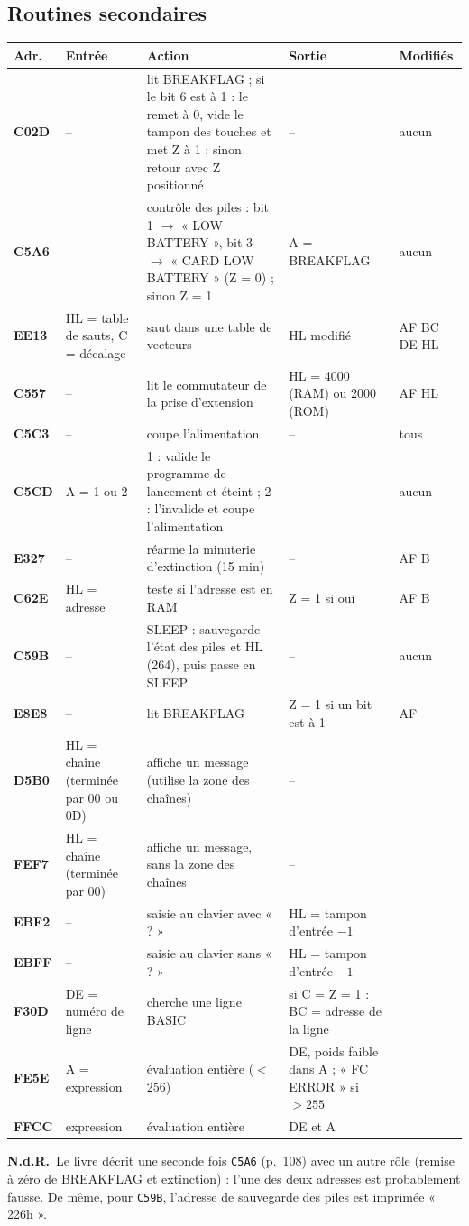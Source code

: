 \documentclass[a4paper,10pt]{article}
\makeatletter
\newcommand{\hex}[1]{\texttt{#1}}
\newcommand{\nota}[1]{\textcolor{red!60!black}{\small\textbf{N.d.R.}~#1}}
\newenvironment{routines}
  {\small\begin{longtable}{@{}>{\ttfamily\bfseries}p{1.1cm}>{\raggedright}p{4.0cm}>{\raggedright}p{5.0cm}>{\raggedright}p{3.1cm}>{\raggedright\arraybackslash}p{2.1cm}@{}}
   \toprule
   \normalfont\bfseries Adr. & \textbf{Entrée} & \textbf{Action} & \textbf{Sortie} & \textbf{Modifiés}\\
   \midrule\endhead
   \bottomrule\endfoot}
  {\end{longtable}}
\makeatother
\begin{document}
\subsection{Routines secondaires}
\begin{routines}
C02D & -- & lit BREAKFLAG ; si le bit 6 est à 1 : le remet à 0, vide le tampon des touches et met Z à 1 ; sinon retour avec Z positionné & -- & aucun \\
C5A6 & -- & contrôle des piles : bit 1 $\to$ « LOW BATTERY », bit 3 $\to$ « CARD LOW BATTERY » (Z = 0) ; sinon Z = 1 & A = BREAKFLAG & aucun \\
EE13 & HL = table de sauts, C = décalage & saut dans une table de vecteurs & HL modifié & AF BC DE HL \\
C557 & -- & lit le commutateur de la prise d'extension & HL = 4000 (RAM) ou 2000 (ROM) & AF HL \\
C5C3 & -- & coupe l'alimentation & -- & tous \\
C5CD & A = 1 ou 2 & 1 : valide le programme de lancement et éteint ; 2 : l'invalide et coupe l'alimentation & -- & aucun \\
E327 & -- & réarme la minuterie d'extinction (15 min) & -- & AF B \\
C62E & HL = adresse & teste si l'adresse est en RAM & Z = 1 si oui & AF B \\
C59B & -- & SLEEP : sauvegarde l'état des piles et HL (264), puis passe en SLEEP & -- & aucun \\
E8E8 & -- & lit BREAKFLAG & Z = 1 si un bit est à 1 & AF \\
D5B0 & HL = chaîne (terminée par 00 ou 0D) & affiche un message (utilise la zone des chaînes) & -- & \\
FEF7 & HL = chaîne (terminée par 00) & affiche un message, sans la zone des chaînes & -- & \\
EBF2 & -- & saisie au clavier avec « ? » & HL = tampon d'entrée $-1$ & \\
EBFF & -- & saisie au clavier sans « ? » & HL = tampon d'entrée $-1$ & \\
F30D & DE = numéro de ligne & cherche une ligne BASIC & si C = Z = 1 : BC = adresse de la ligne & \\
FE5E & A = expression & évaluation entière ($<$ 256) & DE, poids faible dans A ; « FC ERROR » si $>255$ & \\
FFCC & expression & évaluation entière & DE et A & \\
\end{routines}
\nota{Le livre décrit une seconde fois \hex{C5A6} (p.~108) avec un autre rôle
(remise à zéro de BREAKFLAG et extinction) : l'une des deux adresses est
probablement fausse. De même, pour \hex{C59B}, l'adresse de sauvegarde des
piles est imprimée « 226h ».}
\end{document}
